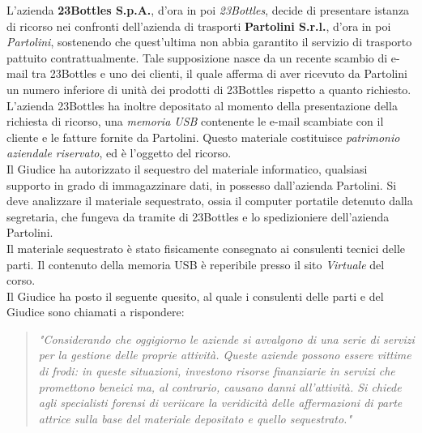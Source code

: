 L’azienda \textbf{23Bottles S.p.A.}, d’ora in poi \textit{23Bottles}, decide di presentare istanza di ricorso nei confronti dell’azienda di trasporti \textbf{Partolini S.r.l.}, d’ora in poi \textit{Partolini}, sostenendo che quest’ultima non abbia garantito il servizio di trasporto pattuito contrattualmente. Tale supposizione nasce da un recente scambio di e-mail tra 23Bottles e uno dei clienti, il quale afferma di aver ricevuto da Partolini un numero inferiore di unità dei prodotti di 23Bottles rispetto a quanto richiesto.\vspace{14pt}\\
L’azienda 23Bottles ha inoltre depositato al momento della presentazione della richiesta di ricorso, una \textit{memoria USB} contenente le e-mail scambiate con il cliente e le fatture fornite da Partolini. Questo materiale costituisce \textit{patrimonio aziendale riservato}, ed è l’oggetto del ricorso.\vspace{14pt}\\
Il Giudice ha autorizzato il sequestro del materiale informatico, qualsiasi supporto in grado di immagazzinare dati, in possesso dall’azienda Partolini. Si deve analizzare il materiale sequestrato, ossia il computer portatile detenuto dalla segretaria, che fungeva da tramite di 23Bottles e lo spedizioniere dell’azienda Partolini.\vspace{14pt}\\
Il materiale sequestrato è stato fisicamente consegnato ai consulenti tecnici delle parti. Il contenuto della memoria USB è reperibile presso il sito \textit{Virtuale} del corso.\vspace{14pt}\\
Il Giudice ha posto il seguente quesito, al quale i consulenti delle parti e del Giudice sono chiamati a rispondere:
\begin{quote}
    \textit{"Considerando che oggigiorno le aziende si avvalgono di una serie di
    servizi per la gestione delle proprie attività. Queste aziende possono essere
    vittime di frodi: in queste situazioni, investono risorse finanziarie in servizi
    che promettono beneici ma, al contrario, causano danni all’attività. 
    Si chiede agli specialisti forensi di veriicare la veridicità delle
    affermazioni di parte attrice sulla base del materiale depositato e quello
    sequestrato."}
\end{quote}